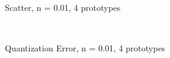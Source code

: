 \documentclass[10pt,a4paper]{article}
\begin{document}
\begin{figure}
  \centering
{} \\
  \caption{Scatter, n = 0.01, 4 prototypes}
  \label{fig:n001_k4}
\end{figure}

\begin{figure}
  \centering
{} \\
  \caption{Quantization Error, n = 0.01, 4 prototypes}
  \label{fig:n001_k4_learning}
\end{figure}
\end{document}
